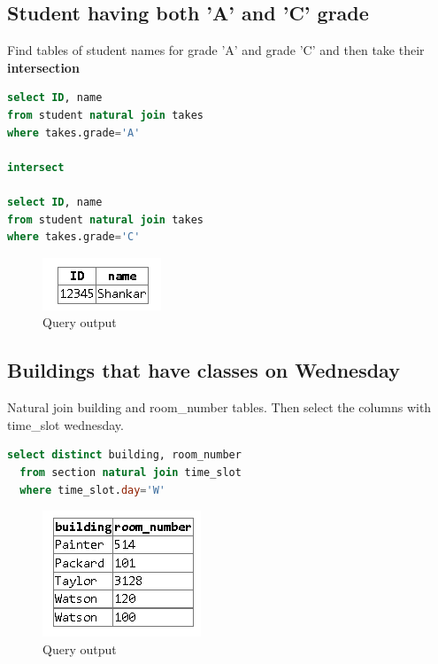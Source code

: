 \documentclass{article}
\begin{document}
\subsection{Student having both 'A' and 'C' grade}
Find tables of student names for grade 'A' and grade 'C' and then take their \textbf{intersection}
\begin{lstlisting}[language=sql]
select ID, name 
from student natural join takes 
where takes.grade='A'

intersect

select ID, name 
from student natural join takes 
where takes.grade='C'
\end{lstlisting}
\begin{figure}[!ht]
  \begin{center}
  \includegraphics[scale=1]{4_b.png}
  \caption{Query output}
  \end{center}
\end{figure}
\subsection{Buildings that have classes on Wednesday}
Natural join building and room\_number tables. Then select the columns with time\_slot wednesday.
\begin{lstlisting}[language=sql]
  select distinct building, room_number
  from section natural join time_slot
  where time_slot.day='W'
\end{lstlisting}
\begin{figure}[!ht]
  \begin{center}
  \includegraphics[scale=1]{4_c.png}
  \caption{Query output}
  \end{center}
\end{figure}
\end{document}
